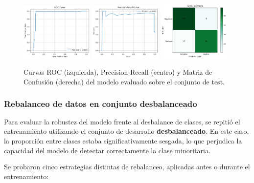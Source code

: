 \documentclass[11pt]{article}
\begin{document}
\begin{figure}[H]
    \centering
    \includegraphics[width=0.32\textwidth]{figures/test_roc.png}
    \hfill
    \includegraphics[width=0.32\textwidth]{figures/test_pr.png}
    \hfill
    \includegraphics[width=0.32\textwidth]{figures/test_confusion_matrix.png}
    \caption{Curvas ROC (izquierda), Precision-Recall (centro) y Matriz de Confusión (derecha) del modelo evaluado sobre el conjunto de test.}
    \label{fig:test_curves}
\end{figure}

\subsubsection*{Rebalanceo de datos en conjunto desbalanceado}

Para evaluar la robustez del modelo frente al desbalance de clases, se repitió el entrenamiento utilizando el conjunto de desarrollo \textbf{desbalanceado}. En este caso, la proporción entre clases estaba significativamente sesgada, lo que perjudica la capacidad del modelo de detectar correctamente la clase minoritaria.

Se probaron cinco estrategias distintas de rebalanceo, aplicadas antes o durante el entrenamiento:
\end{document}
